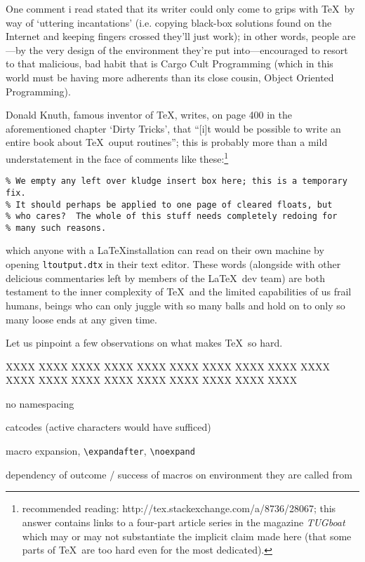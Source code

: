 One comment i read stated that its writer could only come to grips with \TeX\ by way of `uttering
incantations' (i.e. copying black-box solutions found on the Internet and keeping fingers crossed they'll
just work); in other words, people are---by the very design of the environment they're put into---encouraged
to resort to that malicious, bad habit that is Cargo Cult Programming (which
in this world must be having more adherents than its close cousin, Object Oriented Programming).

Donald Knuth, famous inventor of \TeX, writes, on page 400 in the aforementioned chapter `Dirty Tricks',
that ``[i]t would be possible to write an entire book about \TeX\ ouput routines''; this is probably more
than a mild understatement in the face of comments like these:\footnote{recommended reading:
http://tex.stackexchange.com/a/8736/28067; this answer contains links to a four-part article series in the
magazine {\em TUGboat} which may or may not substantiate the implicit claim made here (that some parts of
\TeX\ are  too hard even for the most dedicated).}

\begin{verbatim}
% We empty any left over kludge insert box here; this is a temporary fix.
% It should perhaps be applied to one page of cleared floats, but
% who cares?  The whole of this stuff needs completely redoing for
% many such reasons.
\end{verbatim}

which anyone with a \LaTeX installation can read on their own machine by opening \verb#ltoutput.dtx# in
their text editor. These words (alongside with other delicious commentaries left by members of the \LaTeX\
dev team) are both testament to the inner complexity of \TeX\ and the limited capabilities of us frail
humans, beings who can only juggle with so many balls and hold on to only so many loose ends at any given time.



Let us pinpoint a few observations on what makes \TeX\ so hard.

XXXX XXXX XXXX XXXX XXXX XXXX XXXX XXXX XXXX XXXX XXXX XXXX XXXX XXXX XXXX XXXX XXXX XXXX XXXX

no namespacing

catcodes (active characters would have sufficed)

macro expansion,
\verb#\expandafter#, \verb#\noexpand#

dependency of outcome / success of macros on environment they are called from

